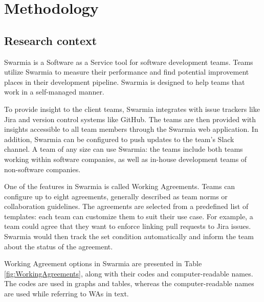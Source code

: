 \chapter{Methodology}

\section{Research context}

Swarmia is a Software as a Service tool for software development teams. Teams utilize Swarmia to measure their performance and find potential improvement places in their development pipeline. Swarmia is designed to help teams that work in a self-managed manner.

To provide insight to the client teams, Swarmia integrates with issue trackers like Jira and version control systems like GitHub. The teams are then provided with insights accessible to all team members through the Swarmia web application. In addition, Swarmia can be configured to push updates to the team's Slack channel. A team of any size can use Swarmia: the teams include both teams working within software companies, as well as in-house development teams of non-software companies. 

One of the features in Swarmia is called Working Agreements. Teams can configure up to eight agreements, generally described as team norms or collaboration guidelines. The agreements are selected from a predefined list of templates: each team can customize them to suit their use case. For example, a team could agree that they want to enforce linking pull requests to Jira issues. Swarmia would then track the set condition automatically and inform the team about the status of the agreement. 



Working Agreement options in Swarmia are presented in Table \ref{fig:WorkingAgreements}, along with their codes and computer-readable names. The codes are used in graphs and tables, whereas the computer-readable names are used while referring to WAs in text.

